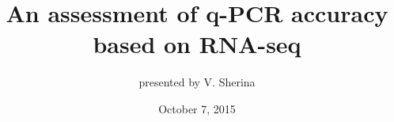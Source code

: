 \documentclass{beamer}
\begin{document}
\title[q-PCR accuracy]{An assessment of q-PCR accuracy based on RNA-seq} %

\author[V. Sherina]{presented by V. Sherina} %
\date{October 7, 2015} %
\begin{frame}
\titlepage
\end{frame}
\end{document}
